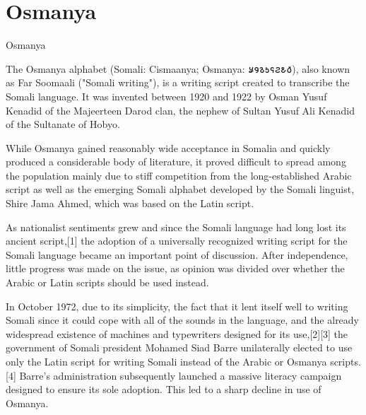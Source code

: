 \section{Osmanya}
\label{s:osmanya}
\newfontfamily{}

\begin{scriptexample}[]{Osmanya}
\end{scriptexample}

The Osmanya alphabet (Somali: Cismaanya; Osmanya: {\osmanya 𐒋𐒘𐒈𐒑𐒛𐒒𐒕𐒀}), also known as Far Soomaali ("Somali writing"), is a writing script created to transcribe the Somali language. It was invented between 1920 and 1922 by Osman Yusuf Kenadid of the Majeerteen Darod clan, the nephew of Sultan Yusuf Ali Kenadid of the Sultanate of Hobyo.

While Osmanya gained reasonably wide acceptance in Somalia and quickly produced a considerable body of literature, it proved difficult to spread among the population mainly due to stiff competition from the long-established Arabic script as well as the emerging Somali alphabet developed by the Somali linguist, Shire Jama Ahmed, which was based on the Latin script.

As nationalist sentiments grew and since the Somali language had long lost its ancient script,[1] the adoption of a universally recognized writing script for the Somali language became an important point of discussion. After independence, little progress was made on the issue, as opinion was divided over whether the Arabic or Latin scripts should be used instead.

In October 1972, due to its simplicity, the fact that it lent itself well to writing Somali since it could cope with all of the sounds in the language, and the already widespread existence of machines and typewriters designed for its use,[2][3] the government of Somali president Mohamed Siad Barre unilaterally elected to use only the Latin script for writing Somali instead of the Arabic or Osmanya scripts.[4] Barre's administration subsequently launched a massive literacy campaign designed to ensure its sole adoption. This led to a sharp decline in use of Osmanya.

